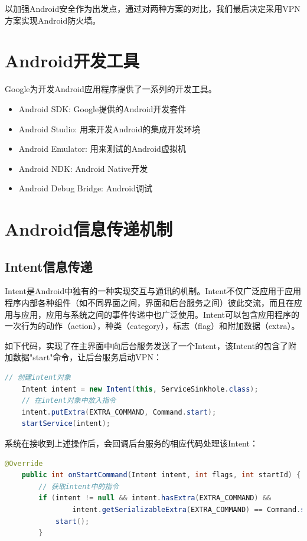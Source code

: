 \documentclass[format=final, language=chinese, degree=fyp]{hustthesis}
\begin{document}
以加强Android安全作为出发点，通过对两种方案的对比，我们最后决定采用VPN方案实现Android防火墙。

\section{Android开发工具}

Google为开发Android应用程序提供了一系列的开发工具。

\begin{itemize}
	\item Android SDK: Google提供的Android开发套件
	\item Android Studio: 用来开发Android的集成开发环境
	\item Android Emulator: 用来测试的Android虚拟机
	\item Android NDK: Android Native开发
	\item Android Debug Bridge: Android调试
\end{itemize}


\section{Android信息传递机制}

\subsection{Intent信息传递}

Intent是Android中独有的一种实现交互与通讯的机制。Intent不仅广泛应用于应用程序内部各种组件（如不同界面之间，界面和后台服务之间）彼此交流，而且在应用与应用，应用与系统之间的事件传递中也广泛使用。Intent可以包含应用程序的一次行为的动作（action），种类（category），标志（flag）和附加数据（extra）。

如下代码，实现了在主界面中向后台服务发送了一个Intent，该Intent的包含了附加数据"start"命令，让后台服务启动VPN：

\begin{lstlisting}[language=java]
	// 创建intent对象
    Intent intent = new Intent(this, ServiceSinkhole.class);
 	// 在intent对象中放入指令
    intent.putExtra(EXTRA_COMMAND, Command.start);
    startService(intent);
\end{lstlisting}

系统在接收到上述操作后，会回调后台服务的相应代码处理该Intent：
\begin{lstlisting}[language=java]
    @Override
    public int onStartCommand(Intent intent, int flags, int startId) {
        // 获取intent中的指令
        if (intent != null && intent.hasExtra(EXTRA_COMMAND) &&
                intent.getSerializableExtra(EXTRA_COMMAND) == Command.start) {
            start();
        }
\end{lstlisting}
\end{document}

